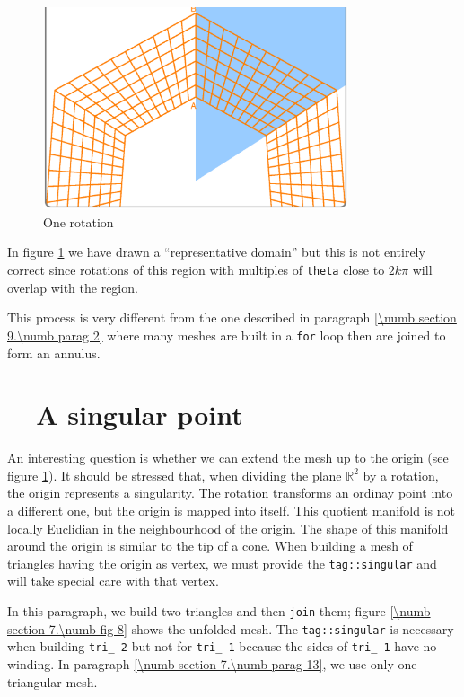 \begin{figure}[ht] \centering
  \includegraphics[width=90mm]{sector-1.eps}
  \caption{One rotation}
  \label{\numb section 7.\numb fig 7}
\end{figure}

In figure \ref{\numb section 7.\numb fig 7}
we have drawn a ``representative domain'' but this is not entirely correct since
rotations of this region with multiples of {\small\tt theta} close to $ 2k\pi $
will overlap with the region.

This process is very different from the one described in paragraph
\ref{\numb section 9.\numb parag 2}
where many meshes are built in a {\small\tt for} loop then are joined to form an annulus.


\section{~~A singular point}\label{\numb section 7.\numb parag 12}

An interesting question is whether we can extend the mesh up to the origin
(see figure \ref{\numb section 7.\numb fig 7}).
It should be stressed that, when dividing the plane $ \mathbb{R}^2 $ by a rotation,
the origin represents a singularity.
The rotation transforms an ordinay point into a different one,
but the origin is mapped into itself.
This quotient manifold is not locally Euclidian in the neighbourhood of the origin.
The shape of this manifold around the origin is similar to the tip of a cone.
When building a mesh of triangles having the origin as vertex,
we must provide the {\small\tt\textcolor{tag}{tag}::singular}
and {\maniFEM} will take special care with that vertex.

In this paragraph, we build two triangles and then {\small\tt join} them;
figure \ref{\numb section 7.\numb fig 8} shows the unfolded mesh.
The {\small\tt\textcolor{tag}{tag}::singular} is necessary when building
{\small\tt tri\_\,2} but not for {\small\tt tri\_\,1}
because the sides of {\small\tt tri\_\,1} have no winding.
In paragraph \ref{\numb section 7.\numb parag 13}, we use only one triangular mesh.

